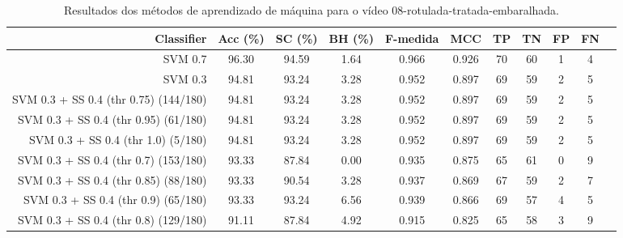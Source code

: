 \begin{table}[!htb]
\centering
\caption{Resultados dos métodos de aprendizado de máquina para o vídeo 08-rotulada-tratada-embaralhada.}
\label{tab:08-rotulada-tratada-embaralhada}
\begin{tabular}{r|c|c|c|c|c|c|c|c|c|c}
\hline\hline
Classifier & Acc (\%) & SC (\%) & BH (\%) & F-medida & MCC & TP & TN & FP & FN \\ \hline
SVM 0.7 & 96.30 & 94.59 & 1.64 & 0.966 & 0.926 & 70 & 60 & 1 & 4 \\ 
SVM 0.3 & 94.81 & 93.24 & 3.28 & 0.952 & 0.897 & 69 & 59 & 2 & 5 \\ 
SVM 0.3 + SS 0.4 (thr 0.75) (144/180) & 94.81 & 93.24 & 3.28 & 0.952 & 0.897 & 69 & 59 & 2 & 5 \\ 
SVM 0.3 + SS 0.4 (thr 0.95) (61/180) & 94.81 & 93.24 & 3.28 & 0.952 & 0.897 & 69 & 59 & 2 & 5 \\ 
SVM 0.3 + SS 0.4 (thr 1.0) (5/180) & 94.81 & 93.24 & 3.28 & 0.952 & 0.897 & 69 & 59 & 2 & 5 \\ 
SVM 0.3 + SS 0.4 (thr 0.7) (153/180) & 93.33 & 87.84 & 0.00 & 0.935 & 0.875 & 65 & 61 & 0 & 9 \\ 
SVM 0.3 + SS 0.4 (thr 0.85) (88/180) & 93.33 & 90.54 & 3.28 & 0.937 & 0.869 & 67 & 59 & 2 & 7 \\ 
SVM 0.3 + SS 0.4 (thr 0.9) (65/180) & 93.33 & 93.24 & 6.56 & 0.939 & 0.866 & 69 & 57 & 4 & 5 \\ 
SVM 0.3 + SS 0.4 (thr 0.8) (129/180) & 91.11 & 87.84 & 4.92 & 0.915 & 0.825 & 65 & 58 & 3 & 9 \\ 
\hline\hline
\end{tabular}
\end{table}
